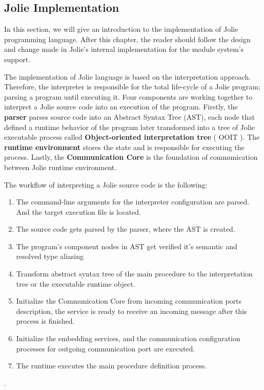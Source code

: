 \subsection{Jolie Implementation}
\label{sec:jolie-implementation}
In this section, we will give an introduction to the implementation of Jolie programming language. After this chapter, the reader should follow the design and change made in Jolie's internal implementation for the module system's support.

The implementation of Jolie language is based on the interpretation approach. Therefore, the interpreter is responsible for the total life-cycle of a Jolie program; parsing a program until executing it. Four components are working together to interpret a Jolie source code into an execution of the program. Firstly, the \textbf{parser} parses source code into an Abstract Syntax Tree (AST), each node that defined a runtime behavior of the program later transformed into a tree of Jolie executable process called \textbf{Object-oriented interpretation tree} ( OOIT ). The \textbf{runtime environment} stores the state and is responsible for executing the process. Lastly, the  \textbf{Communication Core} is the foundation of communication between Jolie runtime environment.


The workflow of interpreting a Jolie source code is the following:

\begin{enumerate}
    \item The command-line arguments for the interpreter configuration are parsed. And the target execution file is located.
    \item The source code gets parsed by the parser, where the AST is created.
    \item The program's component nodes in AST get verified it's semantic and resolved type aliasing
    \item Transform abstract syntax tree of the main procedure to the interpretation tree or the executable runtime object.
    \item Initialize the Communication Core from incoming communication ports description, the service is ready to receive an incoming message after this process is finished.
    \item Initialize the embedding services, and the communication configuration processes for outgoing communication port are executed.
    \item The runtime executes the main procedure definition process.
\end{enumerate}.

\FloatBarrier